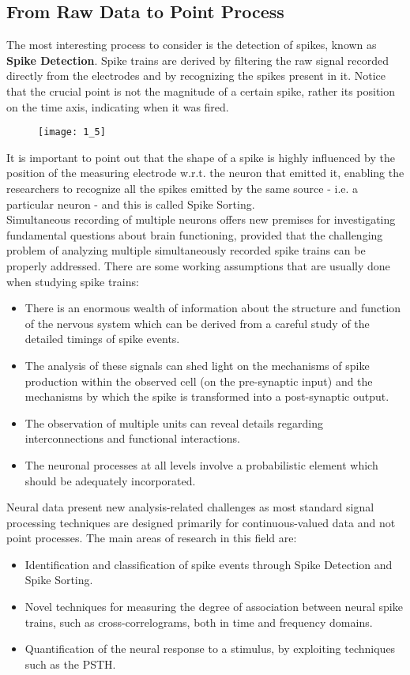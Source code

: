 \subsection{From Raw Data to Point Process}
The most interesting process to consider is the detection of
spikes, known as \textbf{Spike Detection}.
Spike trains are derived by filtering the raw signal recorded directly from the
electrodes and by recognizing the spikes present in it. Notice that the
crucial point is not the magnitude of a certain spike, rather its position
on the time axis, indicating when it was fired.
\begin{figure}[H]
    \texttt{[image: 1\_5]}
    \centering
\end{figure}
It is important to point out that the shape of a spike is highly
influenced by the position of the measuring electrode w.r.t. the neuron
that emitted it, enabling the researchers to recognize all the spikes
emitted by the same source - i.e. a
particular neuron - and this is called Spike Sorting.\\
Simultaneous recording of multiple neurons offers new premises for
investigating fundamental questions about brain functioning, provided that
the challenging problem of analyzing multiple simultaneously recorded
spike trains can be properly addressed.
There are some working assumptions that are usually done when studying
spike trains:
\begin{itemize}
    \item There is an enormous wealth of information about the structure
          and function of the nervous system which can be derived from a careful study
          of the detailed timings of spike events.
    \item The analysis of these signals can shed light on the mechanisms of
          spike production within the observed cell (on the pre-synaptic input) and
          the mechanisms by which the spike is transformed into a post-synaptic
          output.
    \item The observation of multiple units can reveal details regarding
          interconnections and functional interactions.
    \item The neuronal processes at all levels involve a probabilistic element
          which should be adequately incorporated.
\end{itemize}

Neural data present new analysis-related challenges as most standard signal
processing techniques are designed primarily for continuous-valued data
and not point processes.
The main areas of research in this field are:
\begin{itemize}
    \item Identification and classification of spike events through Spike
          Detection and Spike Sorting.
    \item Novel techniques for measuring the degree of association between neural spike trains,
          such as cross-correlograms, both in time and frequency domains.
    \item Quantification of the neural response to a stimulus, by exploiting
          techniques such as the PSTH.
\end{itemize}

